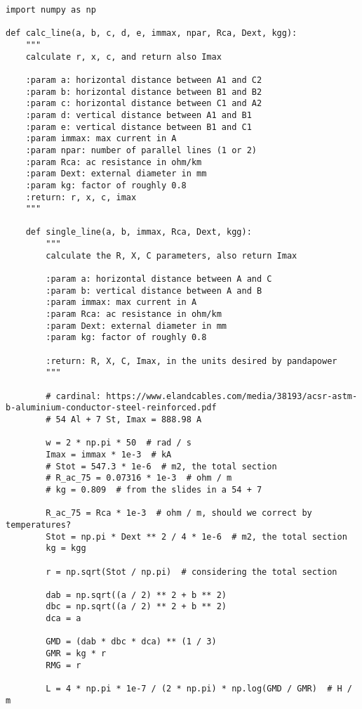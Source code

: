 \begin{lstlisting}[caption={Code for the calculation of lines}]
import numpy as np

def calc_line(a, b, c, d, e, immax, npar, Rca, Dext, kgg):
    """
    calculate r, x, c, and return also Imax

    :param a: horizontal distance between A1 and C2
    :param b: horizontal distance between B1 and B2
    :param c: horizontal distance between C1 and A2
    :param d: vertical distance between A1 and B1
    :param e: vertical distance between B1 and C1
    :param immax: max current in A
    :param npar: number of parallel lines (1 or 2)
    :param Rca: ac resistance in ohm/km
    :param Dext: external diameter in mm
    :param kg: factor of roughly 0.8
    :return: r, x, c, imax
    """

    def single_line(a, b, immax, Rca, Dext, kgg):
        """
        calculate the R, X, C parameters, also return Imax

        :param a: horizontal distance between A and C
        :param b: vertical distance between A and B
        :param immax: max current in A
        :param Rca: ac resistance in ohm/km
        :param Dext: external diameter in mm
        :param kg: factor of roughly 0.8

        :return: R, X, C, Imax, in the units desired by pandapower
        """

        # cardinal: https://www.elandcables.com/media/38193/acsr-astm-b-aluminium-conductor-steel-reinforced.pdf
        # 54 Al + 7 St, Imax = 888.98 A

        w = 2 * np.pi * 50  # rad / s
        Imax = immax * 1e-3  # kA
        # Stot = 547.3 * 1e-6  # m2, the total section
        # R_ac_75 = 0.07316 * 1e-3  # ohm / m
        # kg = 0.809  # from the slides in a 54 + 7

        R_ac_75 = Rca * 1e-3  # ohm / m, should we correct by temperatures?
        Stot = np.pi * Dext ** 2 / 4 * 1e-6  # m2, the total section
        kg = kgg

        r = np.sqrt(Stot / np.pi)  # considering the total section

        dab = np.sqrt((a / 2) ** 2 + b ** 2)
        dbc = np.sqrt((a / 2) ** 2 + b ** 2)
        dca = a

        GMD = (dab * dbc * dca) ** (1 / 3)
        GMR = kg * r
        RMG = r

        L = 4 * np.pi * 1e-7 / (2 * np.pi) * np.log(GMD / GMR)  # H / m


\end{lstlisting}
